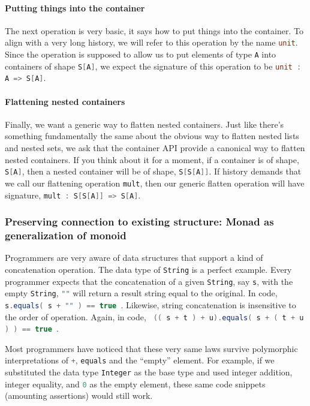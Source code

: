 \paragraph{Putting things into the container} The next operation is
very basic, it says how to put things into the container. To align
with a very long history, we will refer to this operation by the name
\lstinline[language=Scala]!unit!. Since the operation is supposed to allow us to put
elements of type \lstinline[language=Scala]!A! into containers of shape \lstinline[language=Scala]!S[A]!, we
expect the signature of this operation to be \lstinline[language=Scala]!unit : A => S[A]!.
\paragraph{Flattening nested containers} Finally, we want a generic
way to flatten nested containers. Just like there's something
fundamentally the same about the obvious way to flatten nested lists
and nested sets, we ask that the container API provide a canonical way
to flatten nested containers. If you think about it for a moment, if a
container is of shape, \lstinline[language=Scala]!S[A]!, then a nested container will be
of shape, \lstinline[language=Scala]!S[S[A]]!. If history demands that we call our
flattening operation \lstinline[language=Scala]!mult!, then our generic flatten operation
will have signature, \lstinline[language=Scala]!mult : S[S[A]] => S[A]!.

\subsubsection{Preserving connection to existing structure: Monad as
  generalization of monoid}

Programmers are very aware of data structures that support a kind of
concatenation operation. The data type of \lstinline[language=Scala]!String! is a perfect
example. Every programmer expects that the concatenation of a given
\lstinline[language=Scala]!String!, say \lstinline[language=Scala]!s!, with the empty \lstinline[language=Scala]!String!,
\lstinline[language=Scala]!""! will return a result string equal to the original. In
code, \lstinline[language=Scala]! s.equals( s + "" ) == true !. Likewise, string
concatenation is insensitive to the order of operation. Again, in
code, \lstinline[language=Scala]! (( s + t ) + u).equals( s + ( t + u ) ) == true !.

Most programmers have noticed that these very same laws survive
polymorphic interpretations of \lstinline[language=Scala]!+!, \lstinline[language=Scala]!equals! and the
``empty'' element. For example, if we substituted the data type
\lstinline[language=Scala]!Integer! as the base type and used integer addition, integer
equality, and \lstinline[language=Scala]!0! as the empty element, these same code
snippets (amounting assertions) would still work.

